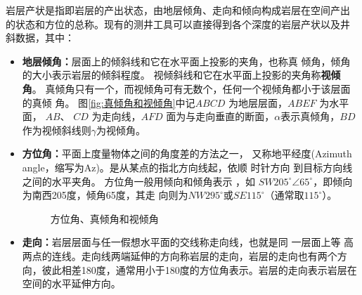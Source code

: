 \documentclass[a4paper,twoside]{ctexart}
\begin{document}
岩层产状是指即岩层的产出状态，由地层倾角、走向和倾向构成岩层在空间产出
的状态和方位的总称。现有的测井工具可以直接得到各个深度的岩层产状以及井
斜数据，其中：
\begin{itemize}
\item \textbf{地层倾角：}层面上的倾斜线和它在水平面上投影的夹角，也称真
  倾角，倾角的大小表示岩层的倾斜程度。
  视倾斜线和它在水平面上投影的夹角称\textbf{视倾角}。
  真倾角只有一个，而视倾角可有无数个，任何一个视倾角都小于该层面的真倾
  角。
  图\ref{fig:真倾角和视倾角}中记$ABCD$ 为地层层面，$ABEF$ 为水平面，
  $AB$、
  $CD$ 为走向线，$AFD$ 面为与走向垂直的断面，$\alpha$表示真倾角，$BD$
  作为视倾斜线则$\gamma$为视倾角。

\item \textbf{方位角：}平面上度量物体之间的角度差的方法之一，
  又称地平经度(Azimuth angle，缩写为Az)。是从某点的指北方向线起，依顺
  时针方向 到目标方向线之间的水平夹角。
方位角一般用倾向和倾角表示 ，如
  $SW205^{\circ} \angle 65^{\circ}$，即倾向为南西205度，倾角65度，其走
  向则为$NW295^{\circ}$或$SE115^{\circ}$（通常取$115^{\circ}$）。

  \begin{figure}[htbp]
  \centering
  \hspace{2cm}
  
  \caption{方位角、真倾角和视倾角}
\end{figure}

\item \textbf{走向：}岩层层面与任一假想水平面的交线称走向线，也就是同
  一层面上等 
  高两点的连线。走向线两端延伸的方向称岩层的走向，岩层的走向也有两个方
  向，彼此相差180度，通常用小于180度的方位角表示。岩层的走向表示岩层在
  空间的水平延伸方向。


\end{itemize}
\end{document}

